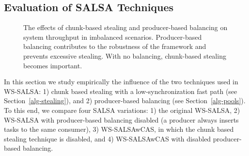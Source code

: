 \subsection{Evaluation of SALSA Techniques}
\label{sec:eval-techniques}
\begin{figure}[htb]
	\centering
	\caption{\footnotesize{The effects of chunk-based stealing and producer-based balancing on system throughput in imbalanced scenarios. Producer-based balancing contributes to the robustness of the framework and prevents excessive stealing. With no balancing, chunk-based stealing becomes important. }}
	\label{fig:1-n-salsa}
\end{figure}
In this section we study empirically the influence of the two techniques used in WS-SALSA: 1) chunk based stealing with a low-synchronization fast path (see Section~\ref{alg-stealing}), and 2) producer-based balancing (see Section~\ref{alg-pools}). 
To this end, we compare four SALSA variations: 1) the original WS-SALSA, 2) WS-SALSA with producer-based balancing disabled (a producer always inserts tasks to the same consumer), 3) WS-SALSAwCAS, in which the chunk based stealing technique is disabled, and 4) WS-SALSAwCAS with disabled producer-based balancing. 

